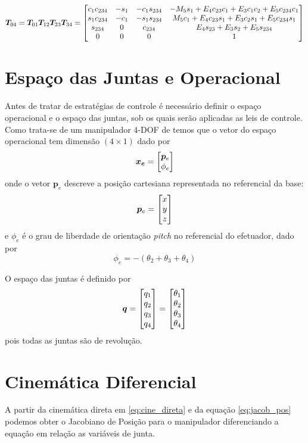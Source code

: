 \begin{equation} \label{eq:cine_direta}
 \bm{T}_{04} = \bm{T}_{01} \bm{T}_{12}  \bm{T}_{23} \bm{T}_{34} = 
\begin{bmatrix}
   c_1 c_{234} & -s_1 & -c_1 s_{234} & -M_5 s_1 + E_4 c_{23}c_1 + E_3 c_1 c_2 + E_5 c_{234} c_1 \\
   s_1 c_{234} & -c_1 & -s_1 s_{234} &   M_5 c_1+E_4 c_{23} s_1 + E_3 c_2 s_1 + E_5 c_{234} s_1 \\
   s_{234}     &    0 &      c_{234} &					     E_4 s_{23} + E_3 s_2 + E_5 s_{234} \\
   0   &    0 &     0 &      												   1
\end{bmatrix} 
\end{equation}

\section{Espaço das Juntas e Operacional}
Antes de tratar de estratégias de controle é necessário definir o espaço operacional e o espaço das juntas,  sob os quais serão aplicadas as leis de controle. 
Como trata-se de um manipulador 4-DOF de temos que o vetor do espaço operacional tem dimensão $(4 \times 1)$ dado por 
\begin{equation}
\bm{x_e} = \begin{bmatrix}\bm{p}_e \\ \phi_e\end{bmatrix}
\end{equation}
onde o vetor $\bm{p}_e$ descreve a posição cartesiana representada no referencial da base:
\begin{equation}
\bm{p}_e = \begin{bmatrix}x \\ y \\ z\end{bmatrix}
\end{equation}
e $\phi_e$ é o grau de liberdade de orientação \textit{pitch} no referencial do efetuador, dado por
\begin{equation}
\phi_e = -(\theta_2 + \theta_3 + \theta_4)
\end{equation}

O espaço das juntas é definido por 
\begin{equation} \label{joint_space}
\bm{q} = \begin{bmatrix}q_1 \\ q_2 \\ q_3 \\ q_4\end{bmatrix} = \begin{bmatrix}\theta_1 \\ \theta_2 \\ \theta_3 \\ \theta_4  \end{bmatrix}
\end{equation} 
pois todas as juntas são de revolução.

\section{Cinemática Diferencial}
A partir da cinemática direta em \eqref{eq:cine_direta} e da equação \ref{eq:jacob_pos} podemos obter o Jacobiano de Posição para o manipulador diferenciando a equação em relação as variáveis de junta.

